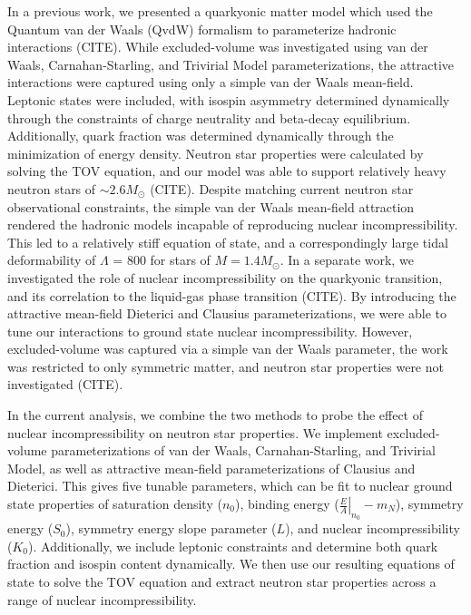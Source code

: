 \documentclass[twocolumn,floatfix,superscriptaddress,a4paper,showkeys,nofootinbib,reprint]{revtex4-1}
\begin{document}
In a previous work, we presented a quarkyonic matter model which used the Quantum van der Waals (QvdW) formalism to parameterize hadronic interactions (CITE). While excluded-volume was investigated using van der Waals, Carnahan-Starling, and Trivirial Model parameterizations, the attractive interactions were captured using only a simple van der Waals mean-field. Leptonic states were included, with isospin asymmetry determined dynamically through the constraints of charge neutrality and beta-decay equilibrium. Additionally, quark fraction was determined dynamically through the minimization of energy density. Neutron star properties were calculated by solving the TOV equation, and our model was able to support relatively heavy neutron stars of $\sim2.6M_{\odot}$ (CITE). Despite matching current neutron star observational constraints, the simple van der Waals mean-field attraction rendered the hadronic models incapable of reproducing nuclear incompressibility. This led to a relatively stiff equation of state, and a correspondingly large tidal deformability of $\Lambda$ = 800 for stars of $M = 1.4M_{\odot}$. In a separate work, we investigated the role of nuclear incompressibility on the quarkyonic transition, and its correlation to the liquid-gas phase transition (CITE). By introducing the attractive mean-field Dieterici and Clausius parameterizations, we were able to tune our interactions to ground state nuclear incompressibility. However, excluded-volume was captured via a simple van der Waals parameter, the work was restricted to only symmetric matter, and neutron star properties were not investigated (CITE).

In the current analysis, we combine the two methods to probe the effect of nuclear incompressibility on neutron star properties. We implement excluded-volume parameterizations of van der Waals, Carnahan-Starling, and Trivirial Model, as well as attractive mean-field parameterizations of Clausius and Dieterici. This gives five tunable parameters, which can be fit to nuclear ground state properties of saturation density ($n_0$), binding energy ($\left. \frac{E}{A}\right|_{n_0}- m_N$), symmetry energy ($S_0$), symmetry energy slope parameter ($L$), and nuclear incompressibility ($K_0$). Additionally, we include leptonic constraints and determine both quark fraction and isospin content dynamically. We then use our resulting equations of state to solve the TOV equation and extract neutron star properties across a range of nuclear incompressibility. 
\end{document}
